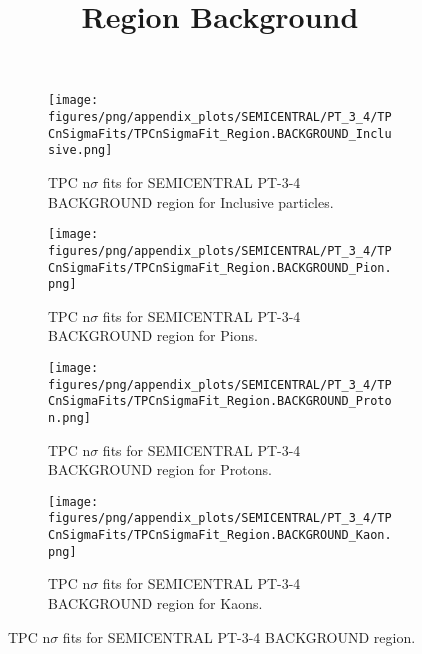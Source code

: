             \begin{figure}[H]
                \title{Region Background}
                \begin{subfigure}[b]{0.5\textwidth}
                    \centering
                    \texttt{[image: figures/png/appendix\_plots/SEMICENTRAL/PT\_3\_4/TPCnSigmaFits/TPCnSigmaFit\_Region.BACKGROUND\_Inclusive.png]}
                    \caption{TPC n$\sigma$ fits for SEMICENTRAL PT-3-4 BACKGROUND region for Inclusive particles.}
                    \label{fig:appendix_SEMICENTRAL_PT-3-4_BACKGROUND_Inclusive}
                \end{subfigure}
                \begin{subfigure}[b]{0.5\textwidth}
                    \centering
                    \texttt{[image: figures/png/appendix\_plots/SEMICENTRAL/PT\_3\_4/TPCnSigmaFits/TPCnSigmaFit\_Region.BACKGROUND\_Pion.png]}
                    \caption{TPC n$\sigma$ fits for SEMICENTRAL PT-3-4 BACKGROUND region for Pions.}
                    \label{fig:appendix_SEMICENTRAL_PT-3-4_BACKGROUND_Pion}
                \end{subfigure}
                \begin{subfigure}[b]{0.5\textwidth}
                    \centering
                    \texttt{[image: figures/png/appendix\_plots/SEMICENTRAL/PT\_3\_4/TPCnSigmaFits/TPCnSigmaFit\_Region.BACKGROUND\_Proton.png]}
                    \caption{TPC n$\sigma$ fits for SEMICENTRAL PT-3-4 BACKGROUND region for Protons.}
                    \label{fig:appendix_SEMICENTRAL_PT-3-4_BACKGROUND_Proton}
                \end{subfigure}
                \begin{subfigure}[b]{0.5\textwidth}
                    \centering
                    \texttt{[image: figures/png/appendix\_plots/SEMICENTRAL/PT\_3\_4/TPCnSigmaFits/TPCnSigmaFit\_Region.BACKGROUND\_Kaon.png]}
                    \caption{TPC n$\sigma$ fits for SEMICENTRAL PT-3-4 BACKGROUND region for Kaons.}
                    \label{fig:appendix_SEMICENTRAL_PT-3-4_BACKGROUND_Kaon}
                \end{subfigure}
                \caption{TPC n$\sigma$ fits for SEMICENTRAL PT-3-4 BACKGROUND region.}
                \label{fig:appendix_SEMICENTRAL_PT-3-4_BACKGROUND}
            \end{figure}
            \clearpage
            
    
